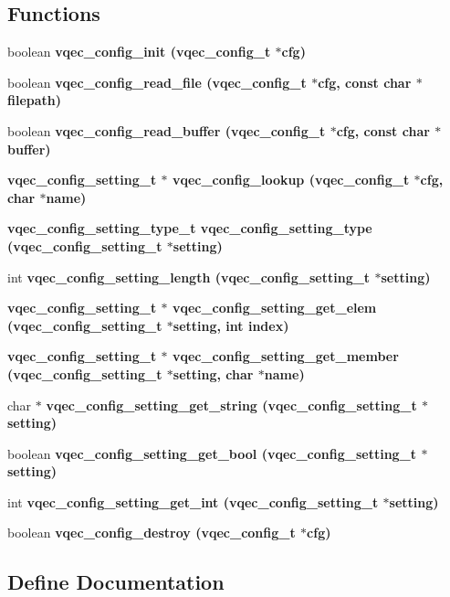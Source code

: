 \subsection*{Functions}
\begin{CompactItemize}
\item 
boolean \bf{vqec\_\-config\_\-init} (\bf{vqec\_\-config\_\-t} $\ast$cfg)
\item 
boolean \bf{vqec\_\-config\_\-read\_\-file} (\bf{vqec\_\-config\_\-t} $\ast$cfg, const char $\ast$filepath)
\item 
boolean \bf{vqec\_\-config\_\-read\_\-buffer} (\bf{vqec\_\-config\_\-t} $\ast$cfg, const char $\ast$buffer)
\item 
\bf{vqec\_\-config\_\-setting\_\-t} $\ast$ \bf{vqec\_\-config\_\-lookup} (\bf{vqec\_\-config\_\-t} $\ast$cfg, char $\ast$name)
\item 
\bf{vqec\_\-config\_\-setting\_\-type\_\-t} \bf{vqec\_\-config\_\-setting\_\-type} (\bf{vqec\_\-config\_\-setting\_\-t} $\ast$setting)
\item 
int \bf{vqec\_\-config\_\-setting\_\-length} (\bf{vqec\_\-config\_\-setting\_\-t} $\ast$setting)
\item 
\bf{vqec\_\-config\_\-setting\_\-t} $\ast$ \bf{vqec\_\-config\_\-setting\_\-get\_\-elem} (\bf{vqec\_\-config\_\-setting\_\-t} $\ast$setting, int index)
\item 
\bf{vqec\_\-config\_\-setting\_\-t} $\ast$ \bf{vqec\_\-config\_\-setting\_\-get\_\-member} (\bf{vqec\_\-config\_\-setting\_\-t} $\ast$setting, char $\ast$name)
\item 
char $\ast$ \bf{vqec\_\-config\_\-setting\_\-get\_\-string} (\bf{vqec\_\-config\_\-setting\_\-t} $\ast$setting)
\item 
boolean \bf{vqec\_\-config\_\-setting\_\-get\_\-bool} (\bf{vqec\_\-config\_\-setting\_\-t} $\ast$setting)
\item 
int \bf{vqec\_\-config\_\-setting\_\-get\_\-int} (\bf{vqec\_\-config\_\-setting\_\-t} $\ast$setting)
\item 
boolean \bf{vqec\_\-config\_\-destroy} (\bf{vqec\_\-config\_\-t} $\ast$cfg)
\end{CompactItemize}


\subsection{Define Documentation}
